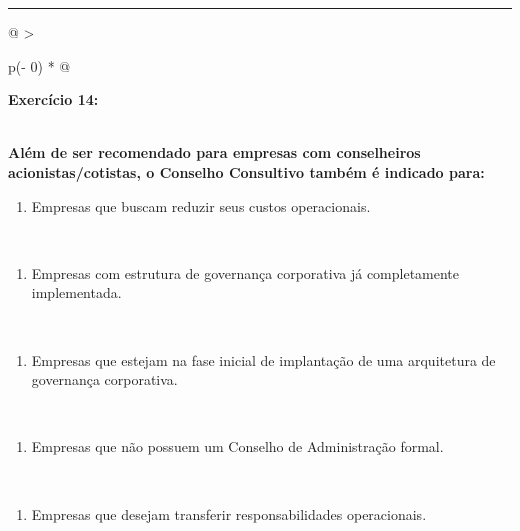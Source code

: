 \documentclass[
]{book}
\providecommand{\tightlist}{%
  \setlength{\itemsep}{0pt}\setlength{\parskip}{0pt}}
\begin{document}
\begin{center}\rule{0.5\linewidth}{0.5pt}\end{center}

\begin{longtable}[]{@{}
  >{\raggedright\arraybackslash}p{(\columnwidth - 0\tabcolsep) * }@{}}
\toprule\noalign{}
\begin{minipage}[b]{\linewidth}\raggedright
\textbf{Exercício 14:}
\end{minipage} \\
\midrule\noalign{}
\endhead
\bottomrule\noalign{}
\endlastfoot
\textbf{Além de ser recomendado para empresas com conselheiros acionistas/cotistas, o Conselho Consultivo também é indicado para:} \\
\begin{minipage}[t]{\linewidth}\raggedright
\begin{enumerate}
\def\labelenumi{\alph{enumi})}
\tightlist
\item
  Empresas que buscam reduzir seus custos operacionais.
\end{enumerate}
\end{minipage} \\
\begin{minipage}[t]{\linewidth}\raggedright
\begin{enumerate}
\def\labelenumi{\alph{enumi})}
\setcounter{enumi}{1}
\tightlist
\item
  Empresas com estrutura de governança corporativa já completamente implementada.
\end{enumerate}
\end{minipage} \\
\begin{minipage}[t]{\linewidth}\raggedright
\begin{enumerate}
\def\labelenumi{\alph{enumi})}
\setcounter{enumi}{2}
\tightlist
\item
  Empresas que estejam na fase inicial de implantação de uma arquitetura de governança corporativa.
\end{enumerate}
\end{minipage} \\
\begin{minipage}[t]{\linewidth}\raggedright
\begin{enumerate}
\def\labelenumi{\alph{enumi})}
\setcounter{enumi}{3}
\tightlist
\item
  Empresas que não possuem um Conselho de Administração formal.
\end{enumerate}
\end{minipage} \\
\begin{minipage}[t]{\linewidth}\raggedright
\begin{enumerate}
\def\labelenumi{\alph{enumi})}
\setcounter{enumi}{4}
\tightlist
\item
  Empresas que desejam transferir responsabilidades operacionais.
\end{enumerate}
\end{minipage} \\
\end{longtable}
\end{document}
